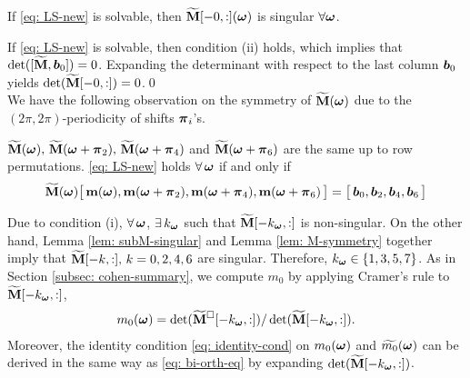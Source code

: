 \begin{lemma}\label{lem: subM-singular}
If \eqref{eq: LS-new} is solvable, then $\widetilde{\mathbf{M}}[-0,:](\boldsymbol{\omega})$ is singular $\forall \boldsymbol{\omega}$.
\end{lemma}
If \eqref{eq: LS-new} is solvable, then condition (ii) holds, which implies that $\det([\widetilde{\mathbf{M}},\boldsymbol{b}_0]) = 0$. Expanding the determinant with respect to the last column $\boldsymbol{b}_0$ yields $\det(\widetilde{\mathbf{M}}[-0,:]) = 0$.\qed\\[1em]
We have the following observation on the symmetry of $\widetilde{\mathbf{M}}(\boldsymbol{\omega})$ due to the $(2\pi,2\pi)$-periodicity of shifts $\boldsymbol{\pi}_i$'s.
\begin{lemma}\label{lem: M-symmetry}
$\widetilde{\mathbf{M}}(\boldsymbol{\omega}),\,\widetilde{\mathbf{M}}(\boldsymbol{\omega}+\boldsymbol{\pi}_2),\,\widetilde{\mathbf{M}}(\boldsymbol{\omega}+\boldsymbol{\pi}_4)$ and $\widetilde{\mathbf{M}}(\boldsymbol{\omega}+\boldsymbol{\pi}_6)$ are the same up to row permutations. \eqref{eq: LS-new} holds $\forall \, \boldsymbol{\omega}$ if and only if 
\begin{align*}
\widetilde{\mathbf{M}}(\boldsymbol{\omega}) \big[\,\mathbf{m}(\boldsymbol{\omega}),\mathbf{m}(\boldsymbol{\omega}+\boldsymbol{\pi}_2),\mathbf{m}(\boldsymbol{\omega}+\boldsymbol{\pi}_4),\mathbf{m}(\boldsymbol{\omega}+\boldsymbol{\pi}_6)\,\big] = \big[\,\boldsymbol{b}_0,\boldsymbol{b}_2,\boldsymbol{b}_4,\boldsymbol{b}_6\,\big]
\end{align*}
\end{lemma}

Due to condition (i), $\forall\,\boldsymbol{\omega}$, $\exists\, k_{\boldsymbol{\omega}}$ such that $\widetilde{\mathbf{M}}[-k_{\boldsymbol{\omega}},:]$ is non-singular. On the other hand, Lemma \ref{lem: subM-singular} and Lemma \ref{lem: M-symmetry} together imply that $\widetilde{\mathbf{M}}[-k,:],\,k=0,2,4,6$ are singular. Therefore, $k_{\boldsymbol{\omega}} \in\{1,3,5,7\}$. 
As in Section \ref{subsec: cohen-summary}, we compute $m_0$ by applying Cramer's rule to $\widetilde{\mathbf{M}}[-k_{\boldsymbol{\omega}},:]$, 
\begin{align}\label{eq: m0-cramer}
m_0(\boldsymbol{\omega}) = \det(\widetilde{\mathbf{M}}^{\Box}[-k_{\boldsymbol{\omega}},:])/\det(\widetilde{\mathbf{M}}[-k_{\boldsymbol{\omega}},:]).
\end{align}
Moreover, the identity condition \eqref{eq: identity-cond} on $m_0(\boldsymbol{\omega})$ and $\widetilde{m_{0}}(\boldsymbol{\omega})$ can be derived in the same way as \eqref{eq: bi-orth-eq} by expanding $\det(\widetilde{\mathbf{M}}[-k_{\boldsymbol{\omega}},:])$.

